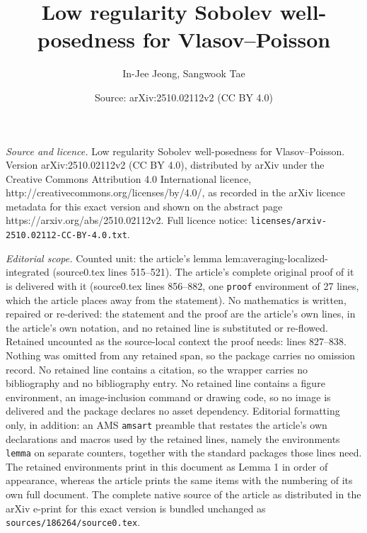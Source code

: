 \documentclass[10pt,a4paper]{amsart}
\title{Low regularity Sobolev well-posedness for Vlasov--Poisson}
\author{In-Jee Jeong, Sangwook Tae}
\date{Source: arXiv:2510.02112v2 (CC BY 4.0)}
\begin{document}
\maketitle

\noindent\emph{Source and licence.} Low regularity Sobolev well-posedness for Vlasov--Poisson. Version arXiv:2510.02112v2 (CC BY 4.0), distributed by arXiv under the Creative Commons Attribution 4.0 International licence, http://creativecommons.org/licenses/by/4.0/, as recorded in the arXiv licence metadata for this exact version and shown on the abstract page https://arxiv.org/abs/2510.02112v2. Full licence notice: \texttt{licenses/arxiv-2510.02112-CC-BY-4.0.txt}.\par\smallskip

\noindent\textit{Editorial scope.} Counted unit: the article's lemma lem:averaging-localized-integrated (source0.tex lines 515--521). The article's complete original proof of it is delivered with it (source0.tex lines 856--882, one \texttt{proof} environment of 27 lines, which the article places away from the statement). No mathematics is written, repaired or re-derived: the statement and the proof are the article's own lines, in the article's own notation, and no retained line is substituted or re-flowed.  Retained uncounted as the source-local context the proof needs: lines 827--838.  Nothing was omitted from any retained span, so the package carries no omission record.  No retained line contains a citation, so the wrapper carries no bibliography and no bibliography entry.  No retained line contains a figure environment, an image-inclusion command or drawing code, so no image is delivered and the package declares no asset dependency.  Editorial formatting only, in addition: an AMS \texttt{amsart} preamble that restates the article's own declarations and macros used by the retained lines, namely the environments \texttt{lemma} on separate counters, together with the standard packages those lines need.  The retained environments print in this document as Lemma 1 in order of appearance, whereas the article prints the same items with the numbering of its own full document.  The complete native source of the article as distributed in the arXiv e-print for this exact version is bundled unchanged as \texttt{sources/186264/source0.tex}.
\end{document}
